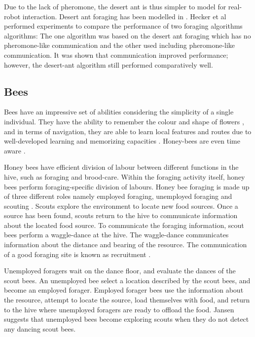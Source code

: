 Due to the lack of pheromone, the desert ant is thus simpler to model for real-robot interaction. Desert ant foraging has been modelled in \cite{moller1998modeling,hecker2012formica}. Hecker et al \cite{hecker2012formica} performed experiments to compare the performance of two foraging algorithms algorithms: The one algorithm was based on the desert ant foraging which has no pheromone-like communication and the other used including pheromone-like communication. It was shown that communication improved performance; however, the desert-ant algorithm still performed comparatively well. 

\subsection{Bees}
\label{bees:biologicalinspiration}
Bees have an impressive set of abilities considering the simplicity of a single individual. They have the ability to remember the colour and shape of flowers \cite{zhang2006honeybee}, and in terms of navigation, they are able to learn local features and routes due to well-developed learning and memorizing capacities \cite{menzel2001cognitive}. Honey-bees are even time aware \cite{moore1989influence}. 

Honey bees have efficient division of labour between different functions in the hive, such as foraging and brood-care. Within the foraging activity itself, honey bees perform foraging-specific division of labours. Honey bee foraging is made up of three different roles namely employed foraging, unemployed foraging and scouting \cite{seeley2009wisdom}. Scouts explore the environment to locate new food sources. Once a source has been found, scouts return to the hive to communicate information about the located food source. To communicate the foraging information, scout bees perform a waggle-dance at the hive. The waggle-dance communicates information about the distance and bearing of the resource. The communication of a good foraging site is known as recruitment \cite{seeley2009wisdom}.

Unemployed foragers wait on the dance floor, and evaluate the dances of the scout bees. An unemployed bee select a location described by the scout bees, and become an employed forager. Employed forager bees use the information about the resource, attempt to locate the source, load themselves with food, and return to the hive where unemployed foragers are ready to offload the food. Jansen \cite{janson2007searching} suggests that unemployed bees become exploring scouts when they do not detect any dancing scout bees. 

